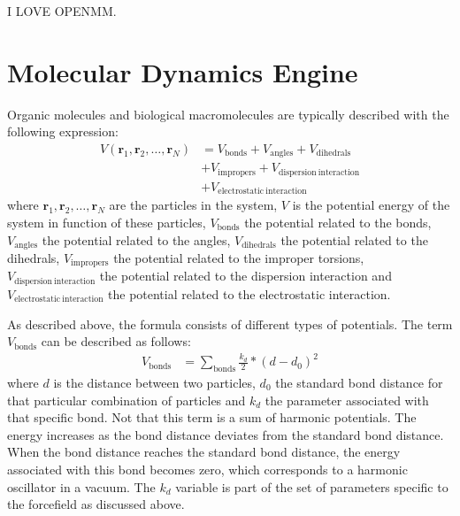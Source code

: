 \documentclass[conference]{IEEEtran}
\begin{document}
I LOVE OPENMM.\cite{eastman2010openmm}



\section{Molecular Dynamics Engine}\label{md}

Organic molecules and biological macromolecules are typically described with the following expression:
\begin{equation}
    \begin{aligned}
    V(\mathbf{r}_1,\mathbf{r}_2,\ldots,\mathbf{r}_N) &= V_{\mathrm{bonds}} + V_{\mathrm{angles}} + 
                                                        V_{\mathrm{dihedrals}}\\
                                                    &+ V_{\mathrm{impropers}} + V_{\mathrm{dispersion \: interaction}}\\
                                                    &+ V_{\mathrm{electrostatic \: interaction}}
    \end{aligned}
\end{equation}
where $\mathbf{r}_1,\mathbf{r}_2,\ldots,\mathbf{r}_N$ are the particles in the system, $V$ is the potential energy of the
system in function of these particles, $V_{\mathrm{bonds}}$ the potential related to the bonds, $V_{\mathrm{angles}}$ 
the potential related to the angles, $V_{\mathrm{dihedrals}}$ the potential related to the dihedrals, 
$V_{\mathrm{impropers}}$ the potential related to the improper torsions, $V_{\mathrm{dispersion \: interaction}}$ 
the potential related to the dispersion interaction and $V_{\mathrm{electrostatic \: interaction}}$ the potential 
related to the electrostatic interaction. 

As described above, the formula consists of different types of potentials.
The term $V_{\mathrm{bonds}}$ can be described as follows:
\begin{equation}
    \begin{aligned}
    V_{\mathrm{bonds}} &= \sum_{\mathrm{bonds}} \frac{k_d}{2}*{(d-d_0)}^2
    \end{aligned}
\end{equation}
where $d$ is the distance between two particles, $d_0$ the standard bond distance for that particular combination of 
particles and $k_d$ the parameter associated with that specific bond. Not that this term is a sum of harmonic 
potentials. The energy increases as the bond distance deviates from the standard bond distance. When the bond 
distance reaches the standard bond distance, the energy associated with this bond becomes zero, which corresponds 
to a harmonic oscillator in a vacuum. The $k_d$ variable is part of the set of parameters specific to the 
forcefield as discussed above.
\end{document}
